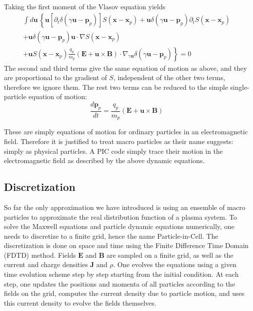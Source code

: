 Taking the first moment of the Vlasov equation yields
\begin{equation}
\begin{split}
    \int d\mathbf{u}\,\left\{ \mathbf{u}\left[ \partial_t \delta(\gamma \mathbf{u} - \mathbf{p}_p) \right]S(\mathbf{x} - \mathbf{x}_p) + \mathbf{u}\delta(\gamma \mathbf{u} - \mathbf{p}_p)\partial_tS(\mathbf{x} - \mathbf{x}_p) \right. \\
    + \mathbf{u}\delta(\gamma \mathbf{u} - \mathbf{p}_p) \mathbf{u}\cdot\nabla S(\mathbf{x} - \mathbf{x}_p) \\
    \left. + \mathbf{u}S(\mathbf{x} - \mathbf{x}_p)\frac{q_p}{m_p}(\mathbf{E} + \mathbf{u}\times \mathbf{B})\cdot \nabla_{\gamma \mathbf{u}}\delta(\gamma \mathbf{u} - \mathbf{p}_p) \right\} = 0
\end{split}
\end{equation}
The second and third terms give the same equation of motion as above, and they
are proportional to the gradient of $S$, independent of the other two terms,
therefore we ignore them. The rest two terms can be reduced to the simple
single-particle equation of motion:
\begin{equation}
\frac{d\mathbf{p}_p}{dt} = \frac{q_p}{m_p}(\mathbf{E} + \mathbf{u}\times \mathbf{B})
\end{equation}

These are simply equations of motion for ordinary particles in an
electromagnetic field. Therefore it is justified to treat macro particles as
their name suggests: simply as physical particles. A PIC code simply trace their
motion in the electromagnetic field as described by the above dynamic equations.


\subsection{Discretization}
\label{sec:discretization}

So far the only approximation we have introduced is using an ensemble of macro
particles to approximate the real distribution function of a plasma system. To
solve the Maxwell equations and particle dynamic equations numerically, one
needs to discretize to a finite grid, hence the name Particle-in-Cell. The
discretization is done on space and time using the Finite Difference Time Domain
(FDTD) method. %
Fields $\mathbf{E}$ and $\mathbf{B}$ are sampled on a finite
grid, as well as the current and charge densities $\mathbf{J}$ and $\rho$. One
evolves the equations using a given time evolution scheme step by step starting
from the initial condition. At each step, one updates the positions and momenta
of all particles according to the fields on the grid, computes the current
density due to particle motion, and uses this current density to evolve the
fields themselves.

